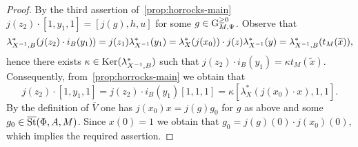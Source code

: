 \begin{proof}
    By the third assertion of~\cref{prop:horrocks-main} $j(z_2) \cdot [1, y_1, 1] = [j(g), h, u]$ for some $g \in \operatorname{G}_{M, \Psi}^{\geq 0}$.
    Observe that
    \[ \lambda_{X^{-1}, B}^* (j(z_2) \cdot i_B(y_1)) = j(z_1) \lambda_{X^{-1}}^*(y_1) = \lambda_X^*(j(x_0)) \cdot j(z) \lambda_{X^{-1}}^*(y) = \lambda_{X^{-1}, B}^*(t_M(\widetilde{x})), \]
    hence there exists $\kappa \in \operatorname{Ker}(\lambda^*_{X^{-1}, B})$ such that $j(z_2) \cdot i_B(y_1) = \kappa t_M(\widetilde{x})$.
    Consequently, from~\cref{prop:horrocks-main} we obtain that
    \[j(z_2) \cdot [1, y_1, 1] = j(z_2) \cdot i_B(y_1) [1, 1, 1] = \kappa [\lambda_X^*(j(x_0) \cdot x), 1, 1].\]
    By the definition of $\overline{V}$ one has $j(x_0) x = j(g) g_0$ for $g$ as above and some $g_0 \in \overline{\operatorname{St}}(\Phi, A, M)$.
    Since $x(0) = 1$ we obtain that $g_0 = j(g)(0) \cdot j(x_0)(0)$, which implies the required assertion.
\end{proof}

